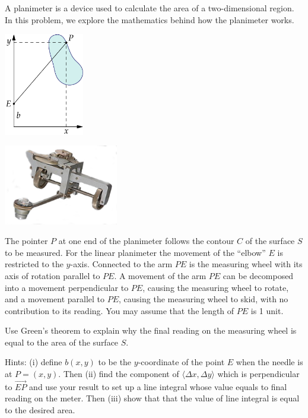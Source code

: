 \documentclass{watsonbook}
\begin{document}
\begin{aexercise} 
  A planimeter is a device used to calculate the area of a
  two-dimensional region. In this problem, we explore the mathematics
  behind how the planimeter works. 

  \begin{center}
    \begin{minipage}{5cm}
      \includegraphics[width=3.5cm]{exercisefigures/planimeter.pdf}
    \end{minipage} \quad 
    \begin{minipage}{5cm}
      \includegraphics[width=5cm]{exercisefigures/myplanimeter.png}
    \end{minipage}
  \end{center}

  The pointer $P$ at one end of the planimeter follows the contour $C$
  of the surface $S$ to be measured. For the linear planimeter the
  movement of the ``elbow'' $E$ is restricted to the
  $y$-axis. Connected to the arm $PE$ is the measuring wheel with its
  axis of rotation parallel to $PE$. A movement of the arm $PE$ can be
  decomposed into a movement perpendicular to $PE$, causing the
  measuring wheel to rotate, and a movement parallel to $PE$, causing
  the measuring wheel to skid, with no contribution to its
  reading. You may assume that the length of $PE$ is 1 unit.

  Use Green's theorem to explain why the final reading on the
  measuring wheel is equal to the area of the surface $S$.

  Hints: (i) define $b(x,y)$ to be the $y$-coordinate of the point $E$
  when the needle is at $P = (x,y)$. Then (ii) find the component of
  $\langle \Delta x, \Delta y\rangle$ which is perpendicular to
  $\overrightarrow{EP}$ and use your result to set up a line integral
  whose value equals to final reading on the meter. Then (iii) show
  that that the value of line integral is equal to the desired
  area.
\end{aexercise}
\end{document}
